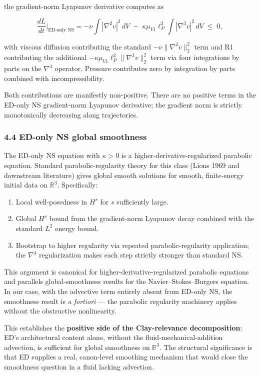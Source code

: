 \documentclass[
]{article}
\providecommand{\tightlist}{%
  \setlength{\itemsep}{0pt}\setlength{\parskip}{0pt}}
\begin{document}
the gradient-norm Lyapunov derivative computes as

\[\frac{dL}{dt}\bigg|_\text{ED-only NS} = -\nu \int |\nabla^2 v|^2 \, dV \;-\; \kappa \mu_{V1} \ell_P^2 \int |\nabla^3 v|^2 \, dV \;\le\; 0,\]

with viscous diffusion contributing the standard
\(-\nu \|\nabla^2 v\|_2^2\) term and R1 contributing the additional
\(-\kappa\mu_{V1}\ell_P^2 \|\nabla^3 v\|_2^2\) term via four
integrations by parts on the \(\nabla^4\) operator. Pressure contributes
zero by integration by parts combined with incompressibility.

Both contributions are manifestly non-positive. There are no positive
terms in the ED-only NS gradient-norm Lyapunov derivative; the gradient
norm is strictly monotonically decreasing along trajectories.

\subsubsection{4.4 ED-only NS global
smoothness}\label{ed-only-ns-global-smoothness}

The ED-only NS equation with \(\kappa > 0\) is a
higher-derivative-regularized parabolic equation. Standard
parabolic-regularity theory for this class (Lions 1969 and downstream
literature) gives global smooth solutions for smooth, finite-energy
initial data on \(\mathbb{R}^3\). Specifically:

\begin{enumerate}
\def\labelenumi{\arabic{enumi}.}
\tightlist
\item
  Local well-posedness in \(H^s\) for \(s\) sufficiently large.
\item
  Global \(H^s\) bound from the gradient-norm Lyapunov decay combined
  with the standard \(L^2\) energy bound.
\item
  Bootstrap to higher regularity via repeated parabolic-regularity
  application; the \(\nabla^4\) regularization makes each step strictly
  stronger than standard NS.
\end{enumerate}

This argument is canonical for higher-derivative-regularized parabolic
equations and parallels global-smoothness results for the
Navier--Stokes--Burgers equation. In our case, with the advective term
entirely absent from ED-only NS, the smoothness result is \emph{a
fortiori} --- the parabolic regularity machinery applies without the
obstructive nonlinearity.

This establishes the \textbf{positive side of the Clay-relevance
decomposition}: ED's architectural content alone, without the
fluid-mechanical-addition advection, is sufficient for global smoothness
on \(\mathbb{R}^3\). The structural significance is that ED supplies a
real, canon-level smoothing mechanism that would close the smoothness
question in a fluid lacking advection.
\end{document}
